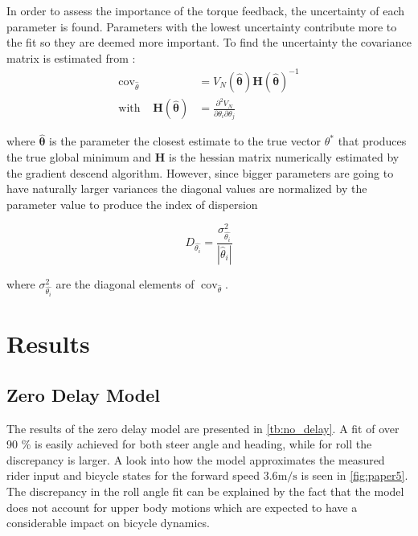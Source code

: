 In order to assess the importance of the torque feedback, the uncertainty of each parameter is found. Parameters with the lowest uncertainty contribute more to the fit so they are deemed more important. To find the uncertainty the covariance matrix is estimated from :
\begin{align}
    \operatorname{cov}_{\hat{\theta}}  &=V_N(\boldsymbol{\hat{\theta}})\boldsymbol{H}(\boldsymbol{\hat{\theta}})^{-1}\\ \text{with} \;\;\;\;  \boldsymbol{H}(\boldsymbol{\hat{\theta}})&= \frac{\partial^{2} V_N}{\partial \theta_{i} \partial \theta_{j}}
\end{align}

where \ensuremath{\boldsymbol{\hat{\theta}}} is the parameter  the closest estimate to the true vector \ensuremath{\theta^*} that produces the true global minimum and \ensuremath{\boldsymbol{H}} is the hessian matrix numerically estimated by the gradient descend algorithm.  However, since bigger parameters are going to have naturally larger variances the diagonal values are normalized by the parameter value to produce the index of dispersion

\begin{equation}
    D_{\hat{\theta_i}}=\frac{\sigma^{2}_{\hat{\theta_i}}}{|\hat{\theta}_i|}
    \end{equation}

    where \ensuremath{\sigma^{2}_{\hat{\theta_i}}} are the diagonal elements of \ensuremath{ \operatorname{cov}_{\hat{\theta}}}.


\section{Results}


\subsection{Zero Delay Model}
The results of the zero delay model are presented in \cref{tb:no_delay}. A fit of over 90 \% is easily achieved for both steer angle and heading, while for roll the discrepancy is larger. A  look into how the model approximates the measured rider input and bicycle states for the forward speed \ensuremath{3.6 \si{\meter\per\second}} is seen in \cref{fig:paper5}. The discrepancy in the roll angle fit can be explained by the fact that the model does not account for upper body motions which are expected to have a considerable impact on bicycle dynamics. 

